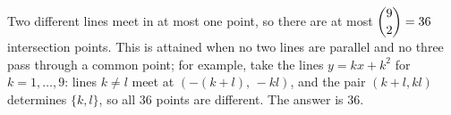 Two different lines meet in at most one point, so there are at most $\dbinom92=36$ intersection points. This is attained when no two lines are parallel and no three pass through a common point; for example, take the lines $y=kx+k^2$ for $k=1,\dots,9$: lines $k\ne l$ meet at $\left(-(k+l),\,-kl\right)$, and the pair $(k+l,kl)$ determines $\{k,l\}$, so all $36$ points are different. The answer is $\boxed{36}$.
